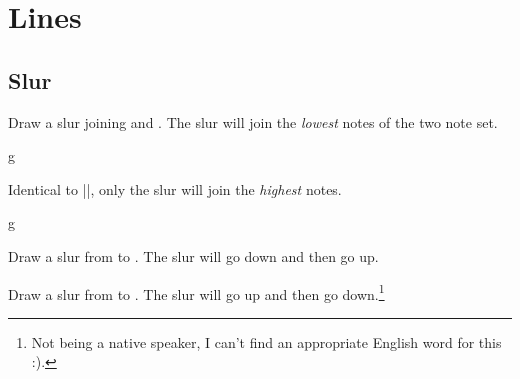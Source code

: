 \section{Lines}\label{sec:line}
\subsection{Slur}\label{sec:line:slur-tie}
\begin{command}{\tmslur{}}
  Draw a slur joining  and . The slur will join the 
  \emph{lowest} notes of the two note set.
\end{command}
\begin{codeexample}[]
\begin{tmline}
\begin{tmstaff}{g}{}
\end{tmstaff}
\end{tmline}
\end{codeexample}
\begin{command}{\tmslur*{}}
  Identical to |\tmslur|, only the slur will join the \emph{highest} notes.
\end{command}
\begin{codeexample}[]
\begin{tmline}
  \begin{tmstaff}{g}{}
  \end{tmstaff}
\end{tmline}
\end{codeexample}
\begin{command}{\tmslurline{}}
  Draw a slur from  to . The slur will go 
  down and then go up.
\end{command}
\begin{command}{\tmslurline*{}}
  Draw a slur from  to . The slur will go 
  up and then go down.\footnote{Not being a native speaker, I can't find an 
  appropriate English word for this :).}
\end{command}
